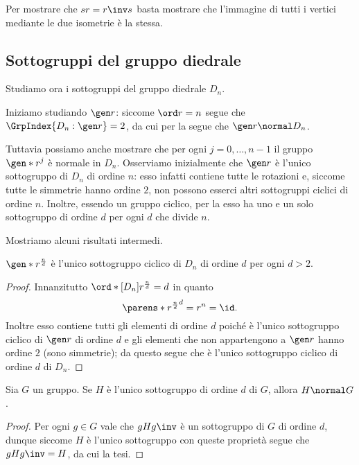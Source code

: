 Per mostrare che $sr = r\inv s$ basta mostrare che l'immagine di tutti i vertici mediante le due isometrie è la stessa. 

\subsection{Sottogruppi del gruppo diedrale}

Studiamo ora i sottogruppi del gruppo diedrale $D_n$.

Iniziamo studiando $\gen r$: siccome $\ord r = n$ segue che $\GrpIndex{D_n : \gen r} = 2$, da cui per la  segue che $\gen r \normal D_n$.

Tuttavia possiamo anche mostrare che per ogni $j = 0, \dots, n-1$ il gruppo $\gen*{r^j}$ è normale in $D_n$. Osserviamo inizialmente che $\gen r$ è l'unico sottogruppo di $D_n$ di ordine $n$: esso infatti contiene tutte le rotazioni e, siccome tutte le simmetrie hanno ordine $2$, non possono esserci altri sottogruppi ciclici di ordine $n$.
Inoltre, essendo un gruppo ciclico, per la  esso ha uno e un solo sottogruppo di ordine $d$ per ogni $d$ che divide $n$.

Mostriamo alcuni risultati intermedi.
\begin{proposition}{}{}
    $\gen*{r^{\frac{n}{d}}}$ è l'unico sottogruppo ciclico di $D_n$ di ordine $d$ per ogni $d > 2$.
\end{proposition}
\begin{proof}
    Innanzitutto $\ord*[D_n]{r^{\frac{n}{d}}} = d$ in quanto \[
        \parens*{r^{\frac{n}{d}}}^d = r^n = \id.
    \] Inoltre esso contiene tutti gli elementi di ordine $d$ poiché è l'unico sottogruppo ciclico di $\gen r$ di ordine $d$ e gli elementi che non appartengono a $\gen r$ hanno ordine $2$ (sono simmetrie); da questo segue che è l'unico sottogruppo ciclico di ordine $d$ di $D_n$.
\end{proof}

\begin{proposition}{}{}
    Sia $G$ un gruppo. Se $H$ è l'unico sottogruppo di ordine $d$ di $G$, allora $H \normal G$.
\end{proposition}
\begin{proof}
    Per ogni $g \in G$ vale che $gHg\inv$ è un sottogruppo di $G$ di ordine $d$, dunque siccome $H$ è l'unico sottogruppo con queste proprietà segue che $gHg\inv = H$, da cui la tesi.
\end{proof}

